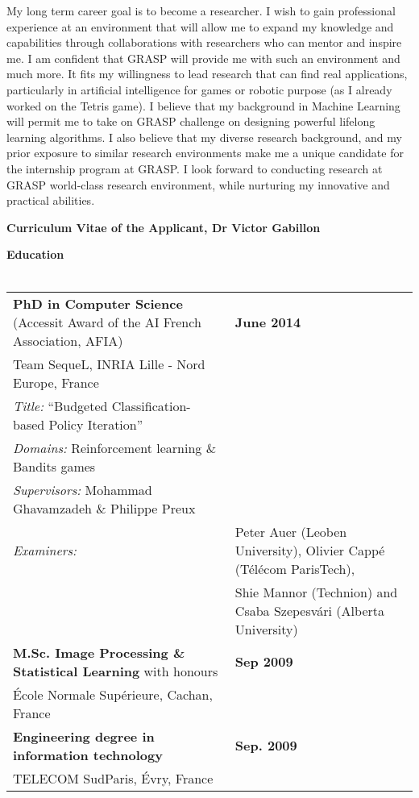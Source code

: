 My long term career goal is to become a  researcher.  I wish to gain professional experience at an environment that will allow me to expand my knowledge and capabilities through collaborations with researchers who can mentor and inspire me. I am confident that GRASP will provide me with such an environment and much more. It fits my willingness to  lead research that can find real applications, particularly in artificial intelligence for games or robotic purpose (as I already worked on the Tetris game). I believe that my background in Machine Learning will permit me to take on GRASP challenge on designing powerful lifelong learning algorithms. I also believe that my diverse research background, and my prior exposure to similar research environments make me a unique candidate for the internship program at GRASP. I look forward to conducting research at GRASP  world-class research environment, while nurturing my innovative and practical abilities.
 \begin{center} \textbf{Curriculum Vitae of the Applicant, Dr Victor Gabillon}  \end{center}
 
\noindent\textbf{Education}\\[-.4cm]\noindent\makebox[\linewidth]{\rule{\columnwidth}{0.4pt}}\\[.1cm]
\noindent\begin{tabularx}{\columnwidth}{@{} l X @{}}
\noindent\textbf{PhD in Computer Science} (Accessit Award of the AI French Association, AFIA)& \hfill \textbf{June 2014} \\
Team SequeL, INRIA Lille - Nord Europe, France\\
\textit{Title:} ``Budgeted Classification-based Policy Iteration''\\
\textit{Domains:} Reinforcement learning \& Bandits games\\
\textit{Supervisors:}  Mohammad Ghavamzadeh \&  Philippe Preux\\
\noindent\textit{Examiners:}\begin{tabular}{ll}  &Peter Auer (Leoben University), Olivier Cappé   (Télécom ParisTech), \\
\noindent & Shie Mannor   (Technion)  and Csaba Szepesvári  (Alberta  University)  
\end{tabular}\\[.2cm]
\textbf{M.Sc. Image Processing \& Statistical Learning} with honours &\hfill \textbf{ Sep 2009}\\
 École Normale Supérieure, Cachan, France\\[.2cm]
\textbf{Engineering degree in information technology}  &\hfill \textbf{ Sep. 2009}\\
 TELECOM SudParis, Évry, France
\end{tabularx}\\[.2cm]

